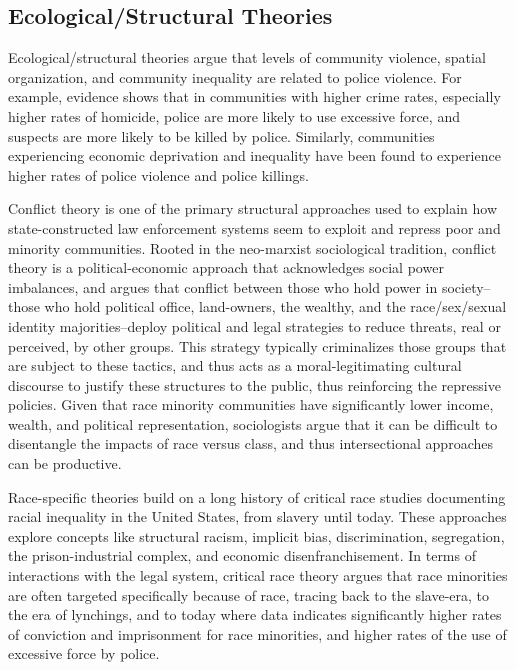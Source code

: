 \documentclass[sigconf]{acmart}
\begin{document}
\subsection{Ecological/Structural Theories}
Ecological/structural theories argue that levels of community violence, spatial organization, and community inequality are related to police violence.  For example, evidence shows that in communities with higher crime rates, especially higher rates of homicide, police are more likely to use excessive force, and suspects are more likely to be killed by police. \cite{nix17,smith04,smith14}  Similarly, communities experiencing economic deprivation and inequality have been found to experience higher rates of police violence and police killings. \cite{jacobs02,meeks06,stults07,legewie15,payne17}  

Conflict theory is one of the primary structural approaches used to explain how state-constructed law enforcement systems seem to exploit and repress poor and minority communities.  Rooted in the neo-marxist sociological tradition, conflict theory is a political-economic approach that acknowledges social power imbalances, and argues that conflict between those who hold power in society--those who hold political office, land-owners, the wealthy, and the race/sex/sexual identity majorities--deploy political and legal strategies to reduce threats, real or perceived, by other groups. \cite{smith14,jacobs02,kaminski05,kent05,petro03,holmes00,holmes12}  This strategy typically criminalizes those groups that are subject to these tactics, and thus acts as a moral-legitimating cultural discourse to justify these structures to the public, thus reinforcing the repressive policies.  Given that race minority communities have significantly lower income, wealth, and political representation, sociologists argue that it can be difficult to disentangle the impacts of race versus class, and thus intersectional approaches can be productive. \cite{gilbert15,maharawal17,payne17}

Race-specific theories build on a long history of critical race studies documenting racial inequality in the United States, from slavery until today. \cite{provine11,chaney13,meeks06,crichlow14,payne17}  These approaches explore concepts like structural racism, implicit bias, discrimination, segregation, the prison-industrial complex, and economic disenfranchisement.  In terms of interactions with the legal system, critical race theory argues that race minorities are often targeted specifically because of race, tracing back to the slave-era, to the era of lynchings, and to today where data indicates significantly higher rates of conviction and imprisonment for race minorities, and higher rates of the use of excessive force by police. \cite{payne17,provine11,meeks06,chaney13,crichlow14,petro03}  
\end{document}

